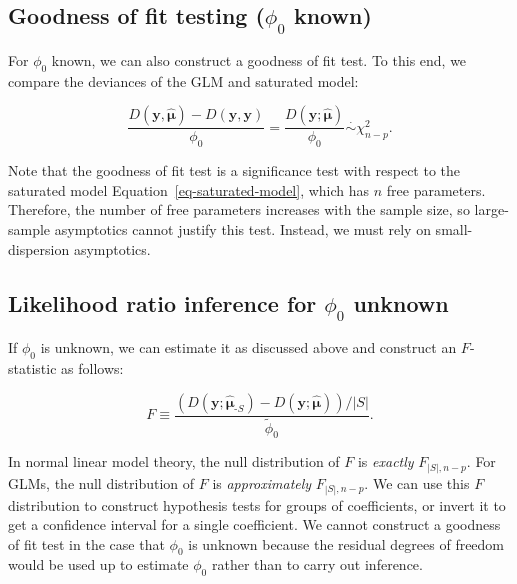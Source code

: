 \documentclass[
  11pt,
  letterpaper,
  oneside]{book}
\theoremstyle{plain}
\theoremstyle{plain}
\theoremstyle{definition}
\theoremstyle{definition}
\theoremstyle{plain}
\theoremstyle{remark}
\begin{document}
\hypertarget{sec-likelihood-ratio-goodness-of-fit}{%
\subsection{\texorpdfstring{Goodness of fit testing (\(\phi_0\)
known)}{Goodness of fit testing (\textbackslash phi\_0 known)}}\label{sec-likelihood-ratio-goodness-of-fit}}

For \(\phi_0\) known, we can also construct a goodness of fit test. To
this end, we compare the deviances of the GLM and saturated model:

\[
\frac{D(\boldsymbol{y}, \boldsymbol{\widehat{\mu}}) - D(\boldsymbol{y}, \boldsymbol{y})}{\phi_0} = \frac{D(\boldsymbol{y}; \boldsymbol{\widehat{\mu}})}{\phi_0} \overset{\cdot}{\sim} \chi^2_{n-p}.
\]

Note that the goodness of fit test is a significance test with respect
to the saturated model Equation~\ref{eq-saturated-model}, which has
\(n\) free parameters. Therefore, the number of free parameters
increases with the sample size, so large-sample asymptotics cannot
justify this test. Instead, we must rely on small-dispersion
asymptotics.

\hypertarget{sec-likelihood-ratio-unknown-dispersion}{%
\subsection{\texorpdfstring{Likelihood ratio inference for \(\phi_0\)
unknown}{Likelihood ratio inference for \textbackslash phi\_0 unknown}}\label{sec-likelihood-ratio-unknown-dispersion}}

If \(\phi_0\) is unknown, we can estimate it as discussed above and
construct an \(F\)-statistic as follows:

\[
F \equiv \frac{(D(\boldsymbol{y}; \boldsymbol{\widehat{\mu}}_{\text{-}S}) - D(\boldsymbol{y}; \boldsymbol{\widehat{\mu}}))/|S|}{\widetilde{\phi}_0}.
\]

In normal linear model theory, the null distribution of \(F\) is
\emph{exactly} \(F_{|S|, n-p}\). For GLMs, the null distribution of
\(F\) is \emph{approximately} \(F_{|S|, n-p}\). We can use this \(F\)
distribution to construct hypothesis tests for groups of coefficients,
or invert it to get a confidence interval for a single coefficient. We
cannot construct a goodness of fit test in the case that \(\phi_0\) is
unknown because the residual degrees of freedom would be used up to
estimate \(\phi_0\) rather than to carry out inference.
\end{document}
